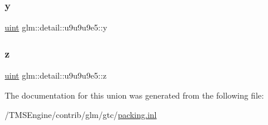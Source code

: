\subsubsection{\texorpdfstring{y}{y}}
{\footnotesize\ttfamily \hyperlink{group__core__precision_ga4fd29415871152bfb5abd588334147c8}{uint} glm\+::detail\+::u9u9u9e5\+::y}

\mbox{\label{unionglm_1_1detail_1_1u9u9u9e5_a9eacfe6494175ce78b6e516746bb63b7}} 
\subsubsection{\texorpdfstring{z}{z}}
{\footnotesize\ttfamily \hyperlink{group__core__precision_ga4fd29415871152bfb5abd588334147c8}{uint} glm\+::detail\+::u9u9u9e5\+::z}



The documentation for this union was generated from the following file\+:\begin{DoxyCompactItemize}
\item 
/\+T\+M\+S\+Engine/contrib/glm/gtc/\hyperlink{packing_8inl}{packing.\+inl}\end{DoxyCompactItemize}
